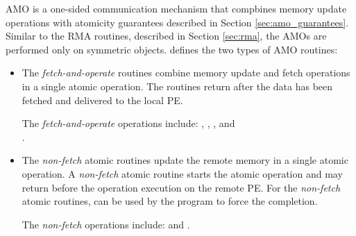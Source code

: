 \label{sec:amo}
\ac{AMO} is a one-sided communication mechanism that compbines memory update operations with atomicity guarantees described in Section \ref{sec:amo_guarantees}. 
Similar to the \ac{RMA} routines, described in Section \ref{sec:rma},
the \acp{AMO} are performed only on symmetric objects. 
\openshmem{} defines the two types of \ac{AMO} routines:
\begin{itemize}
\item %
The \textit{fetch-and-operate} routines combine memory update and fetch 
operations in a single atomic operation.
The routines return after the data has been fetched and delivered to the local \ac{PE}.

The \textit{fetch-and-operate} operations include: , , , and\\ .

\item %
The \textit{non-fetch} atomic routines update the remote memory 
in a single atomic operation.
A \textit{non-fetch} atomic routine
starts the atomic operation and may return before the operation execution
on the remote \ac{PE}. For the \textit{non-fetch} atomic routines, 
can be used by the \openshmem{} program to force the completion. 

The \textit{non-fetch} operations include:  and .
\end{itemize}
